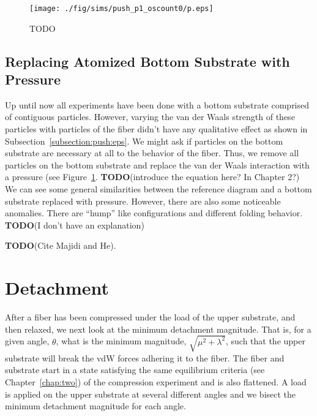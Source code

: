 	\begin{figure}
		\begin{center}
			\texttt{[image: ./fig/sims/push\_p1\_oscount0/p.eps]}
		\end{center}		
		\caption{ TODO
		\label{fig:PushGrid:p1}}
	\end{figure}

\subsection{Replacing Atomized Bottom Substrate with Pressure}

Up until now all experiments have been done with a bottom substrate comprised of contiguous particles. However, varying the van der Waals strength of these particles with particles of the fiber didn't have any qualitative effect as shown in Subsection~\ref{subsection:push:eps}. We might ask if particles on the bottom substrate are necessary at all to the behavior of the fiber. Thus, we remove all particles on the bottom substrate and replace the van der Waals interaction with a pressure (see Figure~\ref{fig:PushGrid:p1}. \textbf{TODO}(introduce the equation here? In Chapter 2?) We can see some general similarities between the reference diagram and a bottom substrate replaced with pressure. However, there are also some noticeable anomalies. There are ``hump'' like configurations and different folding behavior. \textbf{TODO}(I don't have an explanation)

\textbf{TODO}(Cite Majidi and He).

\section{Detachment} \label{ch:detachment}

After a fiber has been compressed under the load of the upper substrate, and then relaxed, we next look at the minimum detachment magnitude. That is, for a given angle, $\theta$, what is the minimum magnitude, $\sqrt{\mu^2 + \lambda^2}$, such that the upper substrate will break the vdW forces adhering it to the fiber. The fiber and substrate start in a state satisfying the same equilibrium criteria (see Chapter~\ref{chap:two}) of the compression experiment and is also flattened. A load is applied on the upper substrate at several different angles and we bisect the minimum detachment magnitude for each angle.

